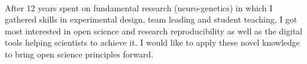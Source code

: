 \begin{minipage}[t]{\textwidth}
\begin{minipage}[b]{0.5\textwidth}
    \end{minipage}\hfill
    \begin{minipage}[b]{0.5\textwidth}
        \begin{flushright}
        \end{flushright}
    \end{minipage}
\end{minipage}\\

After 12 years spent on fundamental research (neuro-genetics) in which I gathered skills in experimental design, team leading and student teaching, I got most interested in open science and research reproducibility as well as the digital tools helping scientists to achieve it.
I would like to apply these novel knowledge %
to bring open science principles forward.

